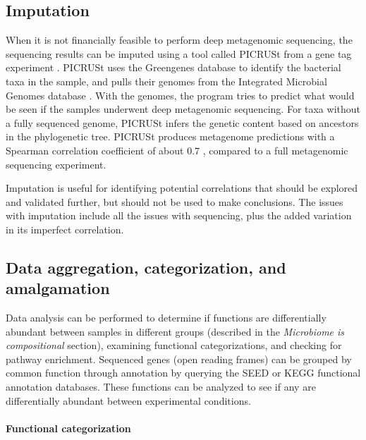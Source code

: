 \subsection{Imputation}
When it is not financially feasible to perform deep metagenomic sequencing, the sequencing results can be imputed using a tool called PICRUSt from a gene tag experiment \cite{langille2013predictive}. PICRUSt uses the Greengenes database \cite{desantis2006greengenes} to identify the bacterial taxa in the sample, and pulls their genomes from the Integrated Microbial Genomes database \cite{markowitz2012img}. With the genomes, the program tries to predict what would be seen if the samples underwent deep metagenomic sequencing. For taxa without a fully sequenced genome, PICRUSt infers the genetic content based on ancestors in the phylogenetic tree. PICRUSt produces metagenome predictions with a Spearman correlation coefficient of about $0.7$ \cite{langille2013predictive}, compared to a full metagenomic sequencing experiment.

Imputation is useful for identifying potential correlations that should be explored and validated further, but should not be used to make conclusions. The issues with imputation include all the issues with sequencing, plus the added variation in its imperfect correlation.

\subsection{Data aggregation, categorization, and amalgamation}
Data analysis can be performed to determine if functions are differentially abundant between samples in different groups (described in the \textit{Microbiome is compositional} section), examining functional categorizations, and checking for pathway enrichment. Sequenced genes (open reading frames) can be grouped by common function through annotation by querying the SEED or KEGG functional annotation databases. These functions can be analyzed to see if any are differentially abundant between experimental conditions.

\paragraph{Functional categorization}\mbox{}\\

